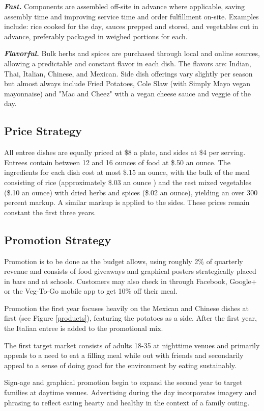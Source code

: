 \documentclass[12pt, letterpaper]{article}
\begin{document}
\textbf{\emph{Fast.}} Components are assembled off-site in advance where applicable, saving assembly time and improving service time and order fulfillment on-site. Examples include: rice cooked for the day, sauces prepped and stored, and vegetables cut in advance, preferably packaged in weighed portions for each. 

\textbf{\emph{Flavorful.}} Bulk herbs and spices are purchased through local and online sources, allowing a predictable and constant flavor in each dish.  The flavors are: Indian, Thai, Italian, Chinese, and Mexican. Side dish offerings vary slightly per season but almost always include Fried Potatoes, Cole Slaw (with Simply Mayo\textregistered{} vegan mayonnaise) and "Mac and Cheez" with a vegan cheese sauce and veggie of the day.
\subsection{Price Strategy}
All entree dishes are equally priced at \$8 a plate, and sides at \$4 per serving. Entrees contain between 12 and 16 ounces of food at \$.50 an ounce. The ingredients for each dish cost at most \$.15 an ounce, with the bulk of the meal consisting of rice (approximately \$.03 an ounce \cite{costs}) and the rest mixed vegetables (\$.10 an ounce) with dried herbs and spices (\$.02 an ounce), yielding an over 300 percent markup. A similar markup is applied to the sides.  These prices remain constant the first three years.
\subsection{Promotion Strategy}
Promotion is to be done as the budget allows, using roughly 2\% of quarterly revenue and consists of food giveaways and graphical posters strategically placed in bars and at schools.  Customers may also check in through Facebook, Google+ or the Veg-To-Go mobile app to get 10\% off their meal.

Promotion the first year focuses heavily on the Mexican and Chinese dishes at first (see Figure \ref{products}), featuring the potatoes as a side. After the first year, the Italian entree is added to the promotional mix.

The first target market consists of adults 18-35 at nighttime venues and primarily appeals to a need to eat a filling meal while out with friends and secondarily appeal to a sense of doing good for the environment by eating sustainably.

Sign-age and graphical promotion begin to expand the second year to target families at daytime venues.  Advertising during the day incorporates imagery and phrasing to reflect eating hearty and healthy in the context of a family outing.
\end{document}
